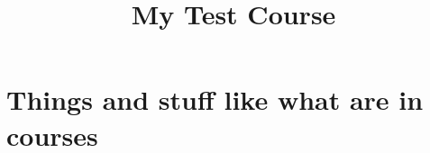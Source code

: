 \documentclass[10pt,handout,twocolumn,wordchoicegiven]{xourse}
\title{My Test Course}
\begin{document}
\maketitle

\setcounter{tocdepth}{2}

\part{Things and stuff like what are in courses}

\chapterstyle
{}
\sectionstyle





\iftikzexport\else\printindex\fi
\end{document}
